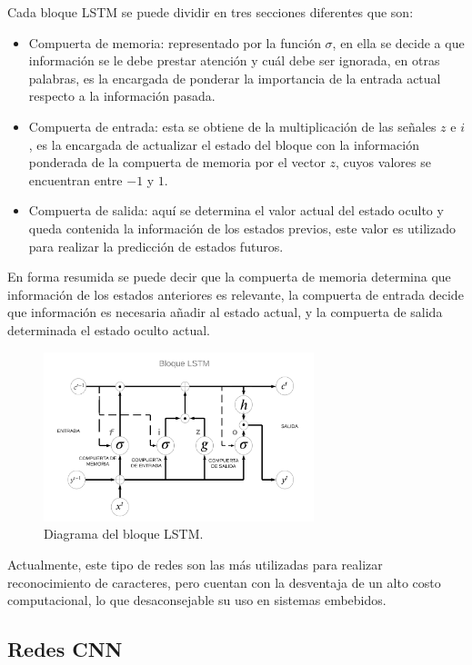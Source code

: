Cada bloque LSTM se puede dividir en tres secciones diferentes que son:

\begin{itemize}
    \item Compuerta de memoria: representado por la función $\sigma$, en ella se decide a que información se le debe prestar atención y cuál debe ser ignorada, en otras palabras, es la encargada de ponderar la importancia de la entrada actual respecto a la información pasada.
    \item Compuerta de entrada: esta se obtiene de la multiplicación de las señales $z$ e $i$, es la encargada de actualizar el estado del bloque con la información ponderada de la compuerta de memoria por el vector $z$, cuyos valores se encuentran entre $-1$ y $1$.
    \item Compuerta de salida: aquí se determina el valor actual del estado oculto y queda contenida la información de los estados previos, este valor es utilizado para realizar la predicción de estados futuros.
\end{itemize}
En forma resumida se puede decir que la compuerta de memoria determina que información de los estados anteriores es relevante, la compuerta de entrada decide que información es necesaria añadir al estado actual, y la compuerta de salida determinada el estado oculto actual.
\begin{figure}[bth]
    \centering
    \includegraphics[width=0.7\textwidth]{imgs/diagrama-lstm.png}
    \caption{Diagrama del bloque LSTM.}
    \label{fig:diagrama-LSTM}
\end{figure}

Actualmente, este tipo de redes son las más utilizadas para realizar reconocimiento de caracteres, pero cuentan con la desventaja de un alto costo computacional, lo que desaconsejable su uso en sistemas embebidos.

\subsection{Redes CNN}

